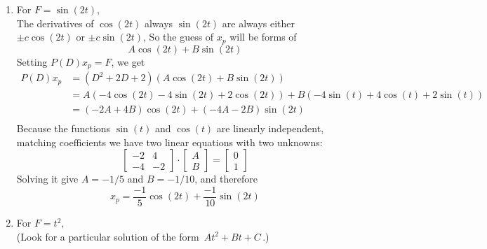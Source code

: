 \begin{enumerate}
\item For $F=\sin (2t),$ \\
    The derivatives of $\cos (2t)$ always $\sin⁡(2t)$ are always
    either $\pm c \cos⁡ (2t)$ or $\pm c \sin⁡ (2t)$,
    So the guess of $x_p$ will be forms of 
    \begin{equation*}
      A \cos (2t) + B \sin (2t) 
    \end{equation*}
    Setting $P(D)x_ p= F$, we get
    \begin{align*}
      P(D)x_p
      &= (D^2+2D+2)\left( A \cos (2t) + B \sin (2t) \right) \\
      &= A \left(- 4 \cos (2t) -4 \sin(2t) + 2 \cos (2t) \right)
        + B \left(- 4\sin (t) +4 \cos(t) + 2 \sin (t) \right) \\
      &= (-2A + 4B) \cos (2t) + (-4A - 2B) \sin (2t) \\    
    \end{align*}
    Because the functions $\sin⁡ (t)$ and $\cos⁡ (t)$ are linearly independent,
    matching coefficients we have two linear equations with two unknowns:
    \[
      \begin{bmatrix}
        -2 & 4 \\
        -4 & -2
      \end{bmatrix}
      \cdot
      \begin{bmatrix}
        A \\
        B
      \end{bmatrix}
      =
      \begin{bmatrix}
        0 \\
        1
      \end{bmatrix}
    \]   
    Solving it give $A = -1/5$ and $B = -1/10$, and therefore
    \begin{equation*}
      x _p = \frac{-1}{5} \cos (2t) + \frac{-1}{10} \sin(2t) 
    \end{equation*}

  \item For $F=t^2,$ \\
    (Look for a particular solution of the form $\, At^2+Bt+C\,$.)\\


\end{enumerate}
